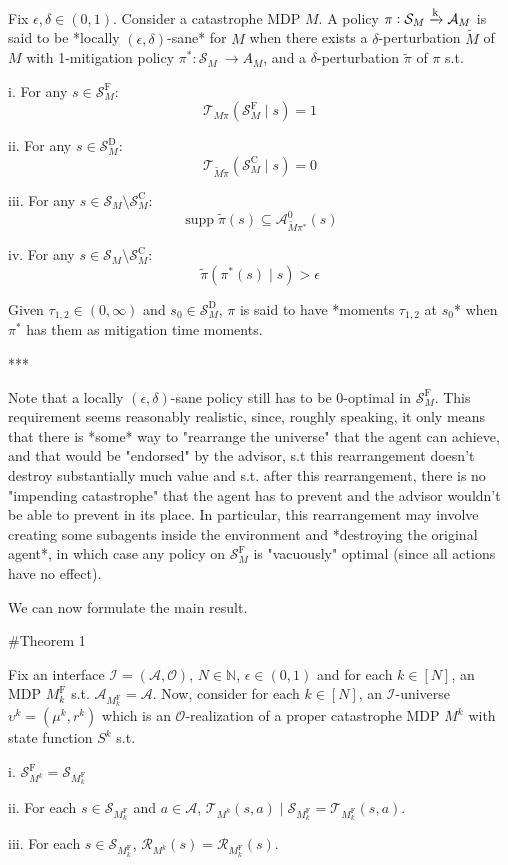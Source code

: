 \documentclass[a4paper]{article}
\DeclareMathOperator{\Supp}{supp}
\newcommand{\AP}[1]{\left(#1\right)}
\newcommand{\Nats}{\mathbb{N}}
\newcommand{\M}{\xrightarrow{\textnormal{k}}}
\newcommand{\Ob}{\mathcal{O}}
\newcommand{\A}{\mathcal{A}}
\newcommand{\St}{\mathcal{S}}
\newcommand{\T}{\mathcal{T}}
\newcommand{\R}{\mathcal{R}}
\newcommand{\In}{\mathcal{I}}
\newcommand{\RMC}{\mathrm{C}}
\newcommand{\RMD}{\mathrm{D}}
\newcommand{\RMF}{\mathrm{F}}
\newcommand{\SF}{\St^{\RMF}}
\newcommand{\SD}{\St^{\RMD}}
\newcommand{\SC}{\St^{\RMC}}
\newcommand{\MF}{M^{\RMF}}
\begin{document}
Fix $\epsilon,\delta \in (0,1)$. Consider a catastrophe MDP $M$. A policy $\pi: \St_M \M \A_M$ is said to be *locally $(\epsilon,\delta)$-sane* for $M$ when there exists a $\delta$-perturbation $\tilde{M}$ of $M$ with 1-mitigation policy $\pi^*: \St_M\ \rightarrow A_M$, and a $\delta$-perturbation $\tilde{\pi}$ of $\pi$ s.t.

i. For any $s \in \SF_M$: $$\T_{M\pi}\AP{\SF_M \mid s} = 1$$

ii. For any $s \in \SD_M$: $$\T_{\tilde{M}\tilde{\pi}}\AP{\SC_M \mid s} = 0$$

iii. For any $s \in \St_M \setminus \SC_M$: $$\Supp{\tilde{\pi}(s)} \subseteq \A_{\tilde{M}\pi^*}^0(s)$$

iv. For any $s \in \St_M \setminus \SC_M$: $$\tilde{\pi}\AP{\pi^*(s) \mid s} > \epsilon$$

Given $\tau_{1,2} \in (0,\infty)$ and $s_0 \in \SD_M$, $\pi$ is said to have *moments $\tau_{1,2}$ at $s_0$* when $\pi^*$ has them as mitigation time moments.

***

Note that a locally $(\epsilon,\delta)$-sane policy still has to be $0$-optimal in $\SF_M$. This requirement seems reasonably realistic, since, roughly speaking, it only means that there is *some* way to "rearrange the universe" that the agent can achieve, and that would be "endorsed" by the advisor, s.t this rearrangement doesn't destroy substantially much value and s.t. after this rearrangement, there is no "impending catastrophe" that the agent has to prevent and the advisor wouldn't be able to prevent in its place. In particular, this rearrangement may involve creating some subagents inside the environment and *destroying the original agent*, in which case any policy on $\SF_M$ is "vacuously" optimal (since all actions have no effect).

We can now formulate the main result.

\#Theorem 1

Fix an interface $\In=(\A,\Ob)$, $N \in \Nats$, $\epsilon \in (0,1)$ and for each $k \in [N]$, an MDP $\MF_k$ s.t. $\A_{\MF_k} = \A$. Now, consider for each $k \in [N]$, an $\In$-universe $\upsilon^k=(\mu^k,r^k)$ which is an $\Ob$-realization of a proper catastrophe MDP $M^k$ with state function $S^k$ s.t.

i. $\SF_{M^k} = \St_{\MF_k}$

ii. For each $s \in \St_{\MF_k}$ and $a \in \A$, $\T_{M^k}(s,a) \mid \St_{\MF_k} = \T_{\MF_k}(s,a)$.

iii. For each $s \in \St_{\MF_k}$, $\R_{M^k}(s)=\R_{\MF_k}(s)$.
\end{document}
